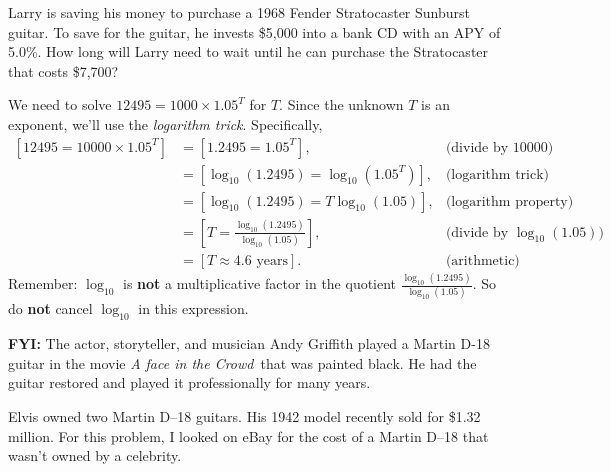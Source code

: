 \documentclass[12pt,fleqn]{exam}
\begin{document}
\begin{questions}
\begin{solution}
\end{solution}

\question [2] Larry is saving his money to purchase a
1968 Fender Stratocaster Sunburst guitar.
To save for the guitar, he invests \$5,000 into a bank CD with an APY of 5.0\%. 
How long will Larry need to wait until he can purchase the Stratocaster that costs
\$7,700?

\begin{solution}[3.0in]
    We need to solve $12495 = 1000 \times 1.05^T$ for $T$. Since the unknown
    $T$ is an exponent, we'll use the \emph{logarithm trick}. Specifically,
    \begin{align*}
      \left[12495 = 10000 \times 1.05^T \right] &= \left[1.2495 = 1.05^T \right], &\mbox{(divide by 10000)} \\
                     &= \left[\log_{10}(1.2495) = \log_{10}(1.05^T) \right],  &\mbox{(logarithm trick)} \\
                     &= \left[\log_{10}(1.2495) = T \log_{10}(1.05) \right],  &\mbox{(logarithm property)} \\
                     &= \left[ T = \frac{\log_{10}(1.2495)}{\log_{10}(1.05)} \right],  &\mbox{(divide by $\log_{10}(1.05)$)} \\
                     &= \left[ T \approx 4.6 \mbox{ years} \right].  &\mbox{(arithmetic)}
    \end{align*}
Remember: $\log_{10}$ is \textbf{not} a multiplicative factor 
in the quotient $\displaystyle \frac{\log_{10}(1.2495)}{\log_{10}(1.05)}$. 
So do \textbf{not} cancel $\log_{10}$ in this expression.


\textbf{FYI:} The actor, storyteller, and musician Andy Griffith played a Martin D-18 guitar in the movie \emph{A face in the Crowd}\
that was painted black. He had the guitar restored and played it professionally
for many years. 

\quad Elvis owned two Martin D--18 guitars. His 1942 model recently sold for \$1.32 million. For this problem, I looked on eBay for the cost of
a Martin D--18 that wasn't owned by a celebrity. 
\end{solution}


\end{questions}
\end{document}
